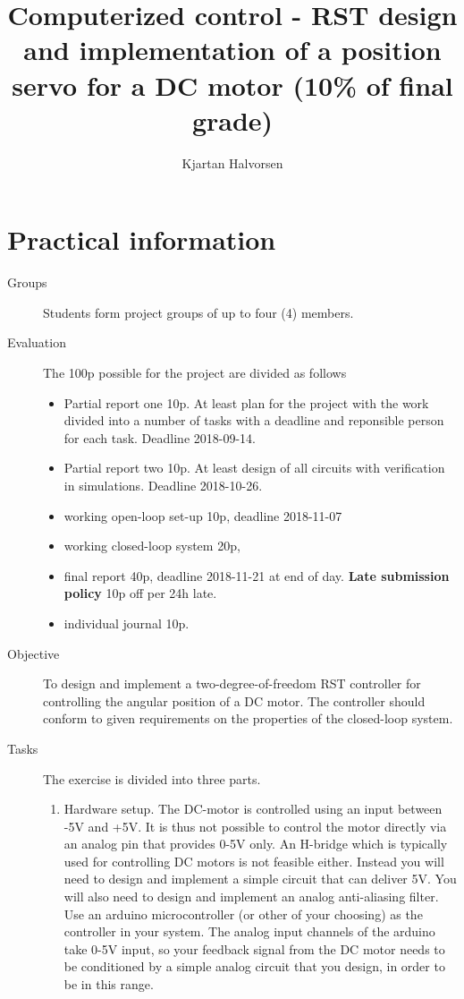 \documentclass[a4paper]{scrartcl}
\author{Kjartan Halvorsen}
\date{}
\title{Computerized control - RST design and implementation of a position servo for a DC motor (10\% of final grade)}
\begin{document}
\maketitle

\section*{Practical information}
\label{sec-1}
\begin{description}
\item[{Groups}] Students form project groups of up to four (4) members.
\item[{Evaluation}] The 100p possible for the project are divided as follows 
\begin{itemize}
\item Partial report one 10p. At least plan for the project with the work divided into a number of tasks with a deadline and reponsible person for each task.   Deadline 2018-09-14.
\item Partial report two 10p. At least design of all circuits with verification in simulations. Deadline 2018-10-26.
\item working open-loop set-up 10p, deadline 2018-11-07
\item working closed-loop system 20p,
\item final report 40p, deadline 2018-11-21 at end of day. \textbf{Late submission policy} 10p off per 24h late.
\item individual journal 10p.
\end{itemize}
\item[{Objective}] To design and implement a two-degree-of-freedom RST controller for controlling the angular position of a DC motor. The controller should conform to given requirements on the properties of the closed-loop system.
\item[{Tasks}] The exercise is divided into three parts.
\begin{enumerate}
\item Hardware setup. The DC-motor is controlled using an input between -5V and +5V. It is thus not possible to control the motor directly via an analog pin that provides 0-5V only. An H-bridge which is typically used for controlling DC motors is not feasible either. Instead you will need to design and implement a simple circuit that can deliver \textpm{} 5V. You will also need to design and implement an analog anti-aliasing filter. Use an arduino microcontroller (or other of your choosing) as the controller in your system. The analog input channels of the arduino take 0-5V input, so your feedback signal from the DC motor needs to be conditioned by a simple analog circuit that you design, in order to be in this range.

\end{enumerate}
\end{description}
\end{document}
